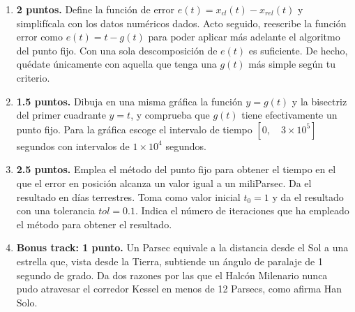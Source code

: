 \begin{enumerate}
\begin{enumerate}
	\item {\bf 2 puntos.} Define la función de error $e(t) = x_{cl}(t) - x_{rel}(t)$ y simplifícala con los datos numéricos dados. Acto seguido, reescribe la función error como $e(t) = t - g(t)$ para poder aplicar más adelante el algoritmo del punto fijo. Con una sola descomposición de $e(t)$ es suficiente. De hecho, quédate únicamente con aquella que tenga una $g(t)$ más simple según tu criterio.

	\item {\bf 1.5 puntos.} Dibuja en una misma gráfica la función $y = g(t)$ y la bisectriz del primer cuadrante $y = t$, y comprueba que $g(t)$ tiene efectivamente un punto fijo. Para la gráfica escoge el intervalo de tiempo $[0, \quad 3 \times 10^5]$ segundos con intervalos de $1\times 10^4$ segundos.
	\item {\bf 2.5 puntos.} Emplea el método del punto fijo para obtener el tiempo en el que el error en posición alcanza un valor igual a un miliParsec. Da el resultado en días terrestres. Toma como valor inicial $t_0 = 1$ y da el resultado con una tolerancia $tol = 0.1$. Indica el número de iteraciones que ha empleado el método para obtener el resultado.
	\item {\bf Bonus track: 1 punto.} Un Parsec equivale a la distancia desde el Sol a una estrella que, vista desde la Tierra, subtiende un ángulo de paralaje de 1 segundo de grado. Da dos razones por las que el Halcón Milenario nunca pudo atravesar el corredor Kessel en menos de 12 Parsecs, como afirma Han Solo.

\end{enumerate}
\end{enumerate}

